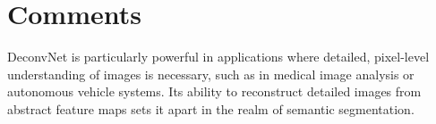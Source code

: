 \section{Comments}
DeconvNet is particularly powerful in applications where detailed, pixel-level understanding of images is necessary, such as in medical image analysis or autonomous vehicle systems. Its ability to reconstruct detailed images from abstract feature maps sets it apart in the realm of semantic segmentation.
